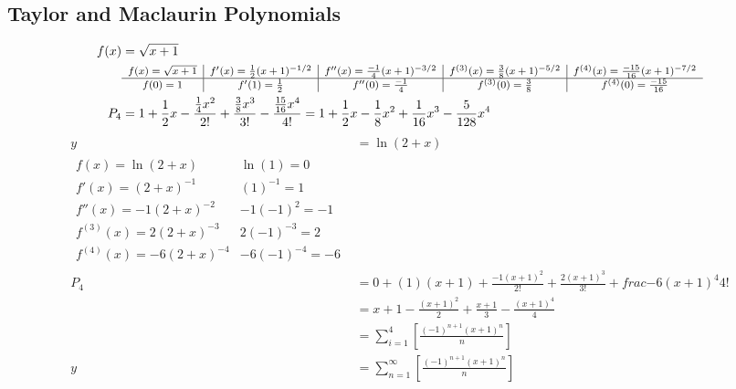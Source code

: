 \documentclass[12pt, A4]{article}
\begin{document}
	\subsection{Taylor and Maclaurin Polynomials}
		\begin{align*}
			f(x) &= \sqrt{x + 1} \\
				&\footnotesize\begin{array}{c|c|c|c|c}
					f(x) = \sqrt{x + 1} & f'(x) = \frac{1}{2}(x + 1)^{-1/2} & f''(x) = \frac{-1}{4}(x + 1)^{-3/2} & f^{(3)}(x) = \frac{3}{8}(x + 1)^{-5/2} & f^{(4)}(x) = \frac{-15}{16}(x + 1)^{-7/2}\\\hline
					f(0) = 1 & f'(1) = \frac{1}{2} & f''(0) = \frac{-1}{4} & f^{(3)}(0) = \frac{3}{8} & f^{(4)}(0) = \frac{-15}{16}
				\end{array} \\
			P_4 &= 1 + \frac{1}{2}x - \frac{\frac{1}{4}x^2}{2!} + \frac{\frac{3}{8}x^3}{3!} - \frac{\frac{15}{16}x^4}{4!} = 1 + \frac{1}{2}x - \frac{1}{8}x^2 + \frac{1}{16}x^3 - \frac{5}{128}x^4
		\end{align*}
		\begin{align*}
			y &= \ln(2 + x) \\ 
			\begin{array}{c|c}
				f(x) = \ln(2 + x) & \ln(1) = 0 \\
				f'(x) = (2 + x)^{-1} & (1)^{-1} = 1 \\
				f''(x) = -1(2 + x)^{-2} & -1(-1)^{2} = -1 \\
				f^{(3)}(x) = 2(2 + x)^{-3} & 2(-1)^{-3} = 2 \\
				f^{(4)}(x) = -6(2 + x)^{-4} & -6(-1)^{-4} = -6
			\end{array} \\
			P_4 &= 0 + (1)(x + 1) + \frac{-1(x + 1)^2}{2!} + \frac{2(x + 1)^3}{3!} + frac{-6(x + 1)^4}{4!} \\
				&= x + 1 - \frac{(x + 1)^2}{2} + \frac{x + 1}{3} - \frac{(x + 1)^4}{4} \\ 
				&= \sum_{i = 1}^4\left[\frac{(-1)^{n + 1}(x + 1)^n}{n}\right] \\
			y &= \sum_{n = 1}^\infty\left[\frac{(-1)^{n + 1}(x + 1)^n}{n}\right]
		\end{align*}
\end{document}
